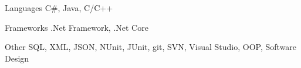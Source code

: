 
\begin{cvskills}
  \cvskill
    {Languages} %
    {C\#, Java, C/C++} %

  \cvskill
    {Frameworks} %
    {.Net Framework, .Net Core} %
  
  \cvskill
    {Other}
    {SQL, XML, JSON, NUnit, JUnit, git, SVN, Visual Studio, OOP, Software Design}
\end{cvskills}
